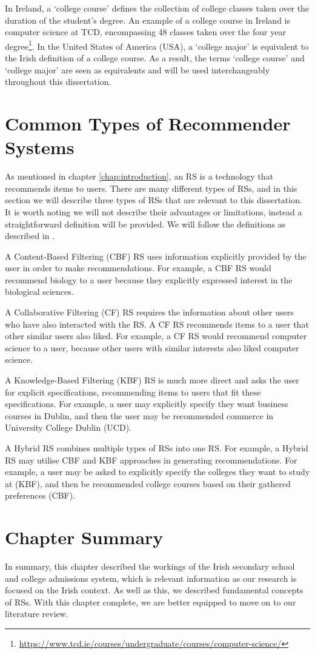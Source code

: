 In Ireland, a `college course' defines the collection of college classes taken over the duration of the student's degree.
An example of a college course in Ireland is computer science at TCD, encompassing 48 classes taken over the four year degree\footnote{\url{https://www.tcd.ie/courses/undergraduate/courses/computer-science/}}.
In the United States of America (USA), a `college major' is equivalent to the Irish definition of a college course.
As a result, the terms `college course' and `college major' are seen as equivalents and will be used interchangeably throughout this dissertation.

\section{Common Types of Recommender Systems}
\label{sec:common-rs-types}

As mentioned in chapter \ref{chap:introduction}, an RS is a technology that recommends items to users.
There are many different types of RSs,
and in this section we will describe three types of RSs that are relevant to this dissertation.
It is worth noting we will not describe their advantages or limitations, instead a straightforward definition will be provided.
We will follow the definitions as described in \cite{aggarwal2016recommender}.

A Content-Based Filtering (CBF) RS uses information explicitly provided by the user in order to make recommendations.
For example, a CBF RS would recommend biology to a user because they explicitly expressed interest in the biological sciences.

A Collaborative Filtering (CF) RS requires the information about other users who have also interacted with the RS.
A CF RS recommends items to a user that other similar users also liked.
For example, a CF RS would recommend computer science to a user, because other users with similar interests also liked computer science.

A Knowledge-Based Filtering (KBF) RS is much more direct and asks the user for explicit specifications, recommending items to users 
that fit these specifications.
For example, a user may explicitly specify they want business courses in Dublin, and then the user may be recommended commerce in University College Dublin (UCD).

A Hybrid RS combines multiple types of RSs into one RS. For example, a Hybrid RS may utilise CBF and KBF approaches in generating recommendations.
For example, a user may be asked to explicitly specify the colleges they want to study at (KBF), and then be recommended college courses based on their gathered preferences (CBF).

\section{Chapter Summary}
\label{sec:background-reading-summary}

In summary, this chapter described the workings of the Irish secondary school and college admissions system,
which is relevant information as our research is focused on the Irish context.
As well as this, we described fundamental concepts of RSs.
With this chapter complete, we are better equipped to move 
on to our literature review.
